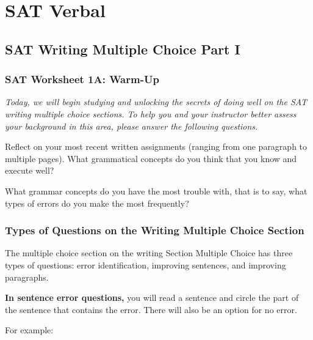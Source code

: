 \documentclass[12pt]{book}
\begin{document}
\newpage
\part{SAT Verbal}
\chapter[Multiple Choice Part I]{SAT Writing Multiple Choice Part I}

\section{SAT Worksheet 1A: Warm-Up}
\textit{Today, we will begin studying and unlocking the secrets of doing well on the SAT writing multiple choice sections. To help you and your instructor better assess your background in this area, please answer the following questions.}

\bigskip
Reflect on your most recent written assignments (ranging from one paragraph to multiple pages). What grammatical concepts do you think that you know and execute well?




\vfill

What grammar concepts do you have the most trouble with, that is to say, what types of errors do you make the most frequently? 

\vfill
\pagebreak
\section[Types of Questions]{Types of Questions on the Writing Multiple Choice Section}

The multiple choice section on the writing Section Multiple Choice has three types of questions: error identification, improving sentences, and improving paragraphs.

\bigskip
\textbf{In sentence error questions,} you will read a sentence and circle the part of the sentence that contains the error. There will also be an option for no error. 

\bigskip
For example:
\end{document}

